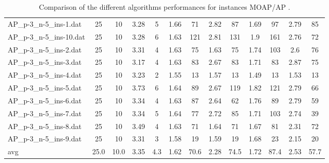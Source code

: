 \begin{table}[!ht]
{\begin{tabular}{lcccccccccccc}
AP\_p-3\_n-5\_ins-1.dat & 25 & 10 & 3.28 & 5 & 1.66 & 71 & 2.82 & 87 & 1.69 & 97 & 2.79 & 85 \\
AP\_p-3\_n-5\_ins-10.dat & 25 & 10 & 3.28 & 6 & 1.63 & 121 & 2.81 & 131 & 1.9 & 161 & 2.76 & 72 \\
AP\_p-3\_n-5\_ins-2.dat & 25 & 10 & 3.31 & 4 & 1.63 & 75 & 1.63 & 75 & 1.74 & 103 & 2.6 & 76 \\
AP\_p-3\_n-5\_ins-3.dat & 25 & 10 & 3.17 & 4 & 1.63 & 83 & 2.67 & 83 & 1.71 & 83 & 2.87 & 75 \\
AP\_p-3\_n-5\_ins-4.dat & 25 & 10 & 3.23 & 2 & 1.55 & 13 & 1.57 & 13 & 1.49 & 13 & 1.53 & 13 \\
AP\_p-3\_n-5\_ins-5.dat & 25 & 10 & 3.73 & 6 & 1.64 & 89 & 2.67 & 119 & 1.82 & 121 & 2.79 & 66 \\
AP\_p-3\_n-5\_ins-6.dat & 25 & 10 & 3.34 & 4 & 1.63 & 87 & 2.64 & 62 & 1.76 & 89 & 2.79 & 59 \\
AP\_p-3\_n-5\_ins-7.dat & 25 & 10 & 3.34 & 5 & 1.64 & 77 & 2.72 & 85 & 1.71 & 103 & 2.74 & 39 \\
AP\_p-3\_n-5\_ins-8.dat & 25 & 10 & 3.49 & 4 & 1.63 & 71 & 1.64 & 71 & 1.67 & 81 & 2.31 & 72 \\
AP\_p-3\_n-5\_ins-9.dat & 25 & 10 & 3.31 & 3 & 1.58 & 19 & 1.59 & 19 & 1.68 & 23 & 2.15 & 20 \\
\hline avg & 25.0 & 10.0 &  3.35 & 4.3 &  1.62 & 70.6 &  2.28 & 74.5 &  1.72 & 87.4 &  2.53 & 57.7 \\ \hline
\bottomrule
\end{tabular}
}%
\caption{Comparison of the different algorithms performances for instances MOAP/AP .}
\end{table}
